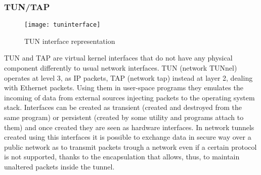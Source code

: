 \subsubsection*{TUN/TAP}
\begin{figure}
  \centering \texttt{[image: tuninterface]}
  \caption{TUN interface representation}
  \label{chap:prjan:img:tun}
\end{figure}
TUN and TAP are virtual kernel interfaces that do not have any physical
component differently to usual network interfaces. TUN (network TUNnel) operates
at level 3, as IP packets, TAP (network tap) instead at layer 2, dealing with
Ethernet packets. Using them in user-space programs they emulates the incoming
of data from external sources injecting packets to the operating system stack.
Interfaces can be created as transient (created and destroyed from the same
program) or persistent (created by some utility and programs attach to them) and
once created they are seen as hardware interfaces. In network tunnels created
using this interfaces it is possible to exchange data in secure way over a
public network as to transmit packets trough a network even if a certain
protocol is not supported, thanks to the encapsulation that allows, thus,
to maintain unaltered packets inside the tunnel.

